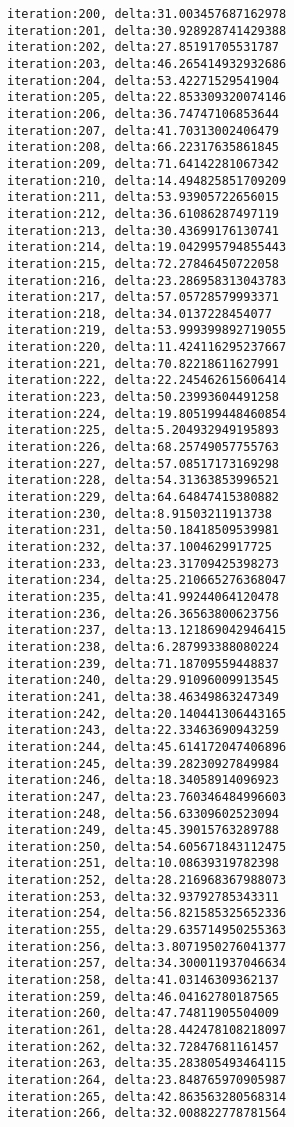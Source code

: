 \documentclass[11pt]{article}
\begin{document}
\begin{Verbatim}[commandchars=\\\{\}]
iteration:200, delta:31.003457687162978
iteration:201, delta:30.928928741429388
iteration:202, delta:27.85191705531787
iteration:203, delta:46.265414932932686
iteration:204, delta:53.42271529541904
iteration:205, delta:22.853309320074146
iteration:206, delta:36.74747106853644
iteration:207, delta:41.70313002406479
iteration:208, delta:66.22317635861845
iteration:209, delta:71.64142281067342
iteration:210, delta:14.494825851709209
iteration:211, delta:53.93905722656015
iteration:212, delta:36.61086287497119
iteration:213, delta:30.43699176130741
iteration:214, delta:19.042995794855443
iteration:215, delta:72.27846450722058
iteration:216, delta:23.286958313043783
iteration:217, delta:57.05728579993371
iteration:218, delta:34.0137228454077
iteration:219, delta:53.999399892719055
iteration:220, delta:11.424116295237667
iteration:221, delta:70.82218611627991
iteration:222, delta:22.245462615606414
iteration:223, delta:50.23993604491258
iteration:224, delta:19.805199448460854
iteration:225, delta:5.204932949195893
iteration:226, delta:68.25749057755763
iteration:227, delta:57.08517173169298
iteration:228, delta:54.31363853996521
iteration:229, delta:64.64847415380882
iteration:230, delta:8.91503211913738
iteration:231, delta:50.18418509539981
iteration:232, delta:37.1004629917725
iteration:233, delta:23.31709425398273
iteration:234, delta:25.210665276368047
iteration:235, delta:41.99244064120478
iteration:236, delta:26.36563800623756
iteration:237, delta:13.121869042946415
iteration:238, delta:6.287993388080224
iteration:239, delta:71.18709559448837
iteration:240, delta:29.91096009913545
iteration:241, delta:38.46349863247349
iteration:242, delta:20.140441306443165
iteration:243, delta:22.33463690943259
iteration:244, delta:45.614172047406896
iteration:245, delta:39.28230927849984
iteration:246, delta:18.34058914096923
iteration:247, delta:23.760346484996603
iteration:248, delta:56.63309602523094
iteration:249, delta:45.39015763289788
iteration:250, delta:54.605671843112475
iteration:251, delta:10.08639319782398
iteration:252, delta:28.216968367988073
iteration:253, delta:32.93792785343311
iteration:254, delta:56.821585325652336
iteration:255, delta:29.635714950255363
iteration:256, delta:3.8071950276041377
iteration:257, delta:34.300011937046634
iteration:258, delta:41.03146309362137
iteration:259, delta:46.04162780187565
iteration:260, delta:47.74811905504009
iteration:261, delta:28.442478108218097
iteration:262, delta:32.72847681161457
iteration:263, delta:35.283805493464115
iteration:264, delta:23.848765970905987
iteration:265, delta:42.863563280568314
iteration:266, delta:32.008822778781564

\end{Verbatim}
\end{document}
